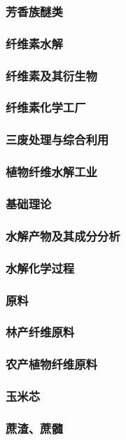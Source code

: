 \documentclass[UTF8]{../../ApplicationUniverse}
\begin{document}
            \subsubsection{芳香族醚类}
        \subsubsection{纤维素水解}
        \subsubsection{纤维素及其衍生物}
    \subsubsection{纤维素化学工厂}
    \subsubsection{三废处理与综合利用}
\subsubsection{植物纤维水解工业}
    \subsubsection{基础理论}
        \subsubsection{水解产物及其成分分析}
    \subsubsection{水解化学过程}
    \subsubsection{原料}
        \subsubsection{林产纤维原料}
        \subsubsection{农产植物纤维原料}
            \subsubsection{玉米芯}
            \subsubsection{蔗渣、蔗髓}
\end{document}
